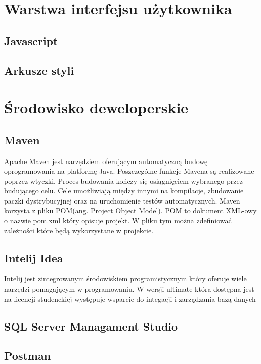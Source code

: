 \section{Warstwa interfejsu użytkownika}
\subsection{Javascript}
\subsection{Arkusze styli}

\section{Środowisko deweloperskie}
\subsection{Maven}
Apache Maven jest narzędziem oferującym automatyczną budowę oprogramowania na platformę Java. Poszczególne funkcje Mavena są realizowane poprzez wtyczki. Proces budowania kończy się osiągnięciem wybranego przez budującego celu. Cele umożliwiają między innymi na kompilacje, zbudowanie paczki dystrybucyjnej oraz na uruchomienie testów automatycznych. Maven korzysta z pliku POM(ang. Project Object Model). POM to dokument XML-owy o nazwie pom.xml który opisuje projekt. W pliku tym można zdefiniować zależności które będą wykorzystane w projekcie. 

\subsection{Intelij Idea}
Intelij jest zintegrowanym środowiskiem programistycznym który oferuje wiele narzędzi pomagającym w programowaniu. W wersji ultimate która dostępna jest na licencji studenckiej występuje wsparcie do integacji i zarządzania bazą danych

\subsection{SQL Server Managament Studio}

\subsection{Postman}




